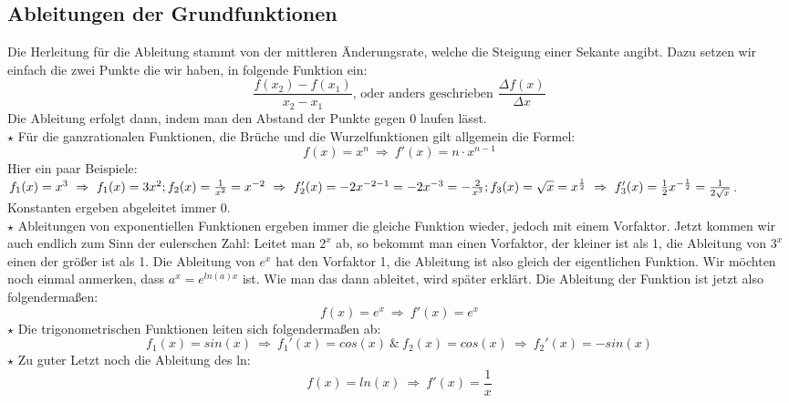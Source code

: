 \subsection{Ableitungen der Grundfunktionen}
Die Herleitung für die Ableitung stammt von der mittleren Änderungsrate, welche die Steigung einer Sekante angibt. Dazu setzen wir einfach die zwei Punkte die wir haben, in folgende Funktion ein:
\[\frac{f(x_2)-f(x_1)}{x_2-x_1}\textrm{, oder anders geschrieben } \frac{\Delta f(x)}{\Delta x}\]
Die Ableitung erfolgt dann, indem man den Abstand der Punkte gegen 0 laufen lässt.\\
\(\star\) Für die ganzrationalen Funktionen, die Brüche und die Wurzelfunktionen gilt allgemein die Formel:
\[f(x)=x^n\ \Rightarrow\ f'(x)=n\cdot x^{n-1}\]
Hier ein paar Beispiele: \(f_1(x)=x^3\ \Rightarrow\ f_1(x)=3x^2;\\ f_2(x)=\frac{1}{x^2}=x^{-2}\ \Rightarrow\ f_2'(x)=-2x^{-2-1}=-2x^{-3}=-\frac{2}{x^3};\\ f_3(x)=\sqrt{x}=x^{\frac{1}{2}}\ \Rightarrow\ f_3'(x)=\frac{1}{2}x^{-\frac{1}{2}}=\frac{1}{2\sqrt{x}}\).\\
Konstanten ergeben abgeleitet immer 0.\\
\(\star\) Ableitungen von exponentiellen Funktionen ergeben immer die gleiche Funktion wieder, jedoch mit einem Vorfaktor. Jetzt kommen wir auch endlich zum Sinn der eulerschen Zahl: Leitet man \(2^x\) ab, so bekommt man einen Vorfaktor, der kleiner ist als 1, die Ableitung von \(3^x\) einen der größer ist als 1. Die Ableitung von \(e^x\) hat den Vorfaktor 1, die Ableitung ist also gleich der eigentlichen Funktion. Wir möchten noch einmal anmerken, dass \(a^x=e^{ln(a)x}\) ist. Wie man das dann ableitet, wird später erklärt. Die Ableitung der Funktion ist jetzt also folgendermaßen:
\[f(x)=e^x\ \Rightarrow\ f'(x)=e^x\]
\(\star\) Die trigonometrischen Funktionen leiten sich folgendermaßen ab:
\[f_1(x)=sin(x)\ \Rightarrow\ f_1'(x)=cos(x)\ \&\ f_2(x)=cos(x)\ \Rightarrow\ f_2'(x)=-sin(x)\]
\(\star\) Zu guter Letzt noch die Ableitung des ln:
\[f(x)=ln(x)\ \Rightarrow\ f'(x)=\frac{1}{x}\]
